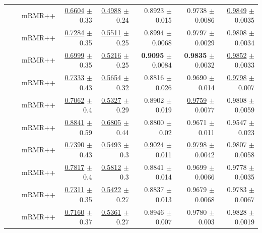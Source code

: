 \begin{longtable}{llp{}rrrrr}
 &  & mRMR++ & \underline{0.6604} {\scriptsize $\pm$ 0.33} & \underline{0.4988} {\scriptsize $\pm$ 0.24} & 0.8923 {\scriptsize $\pm$ 0.015} & 0.9738 {\scriptsize $\pm$ 0.0086} & \underline{0.9849} {\scriptsize $\pm$ 0.0035} \\
 &  & mRMR++ & \underline{0.7284} {\scriptsize $\pm$ 0.35} & \underline{0.5511} {\scriptsize $\pm$ 0.25} & 0.8994 {\scriptsize $\pm$ 0.0068} & 0.9797 {\scriptsize $\pm$ 0.0029} & 0.9808 {\scriptsize $\pm$ 0.0034} \\
 &  & mRMR++ & \underline{0.6999} {\scriptsize $\pm$ 0.35} & \underline{0.5216} {\scriptsize $\pm$ 0.25} & \textbf{0.9095} {\scriptsize $\pm$ 0.0084} & \textbf{0.9835} {\scriptsize $\pm$ 0.0032} & \underline{0.9852} {\scriptsize $\pm$ 0.0033} \\
 &  & mRMR++ & \underline{0.7333} {\scriptsize $\pm$ 0.43} & \underline{0.5654} {\scriptsize $\pm$ 0.32} & 0.8816 {\scriptsize $\pm$ 0.026} & 0.9690 {\scriptsize $\pm$ 0.014} & \underline{0.9798} {\scriptsize $\pm$ 0.007} \\
 &  & mRMR++ & \underline{0.7062} {\scriptsize $\pm$ 0.4} & \underline{0.5327} {\scriptsize $\pm$ 0.29} & 0.8902 {\scriptsize $\pm$ 0.019} & \underline{0.9759} {\scriptsize $\pm$ 0.0077} & 0.9808 {\scriptsize $\pm$ 0.0059} \\
 &  & mRMR++ & \underline{0.8841} {\scriptsize $\pm$ 0.59} & \underline{0.6805} {\scriptsize $\pm$ 0.44} & 0.8800 {\scriptsize $\pm$ 0.02} & 0.9671 {\scriptsize $\pm$ 0.011} & 0.9547 {\scriptsize $\pm$ 0.023} \\
 &  & mRMR++ & \underline{0.7390} {\scriptsize $\pm$ 0.43} & \underline{0.5493} {\scriptsize $\pm$ 0.3} & \underline{0.9024} {\scriptsize $\pm$ 0.011} & \underline{0.9798} {\scriptsize $\pm$ 0.0042} & 0.9807 {\scriptsize $\pm$ 0.0058} \\
 &  & mRMR++ & \underline{0.7817} {\scriptsize $\pm$ 0.4} & \underline{0.5812} {\scriptsize $\pm$ 0.3} & 0.8841 {\scriptsize $\pm$ 0.014} & 0.9699 {\scriptsize $\pm$ 0.0066} & 0.9778 {\scriptsize $\pm$ 0.0035} \\
 &  & mRMR++ & \underline{0.7311} {\scriptsize $\pm$ 0.35} & \underline{0.5422} {\scriptsize $\pm$ 0.27} & 0.8837 {\scriptsize $\pm$ 0.013} & 0.9679 {\scriptsize $\pm$ 0.0068} & 0.9783 {\scriptsize $\pm$ 0.0067} \\
 &  & mRMR++ & \underline{0.7160} {\scriptsize $\pm$ 0.37} & \underline{0.5361} {\scriptsize $\pm$ 0.27} & 0.8946 {\scriptsize $\pm$ 0.007} & 0.9780 {\scriptsize $\pm$ 0.003} & 0.9828 {\scriptsize $\pm$ 0.0019} \\

\end{longtable}
